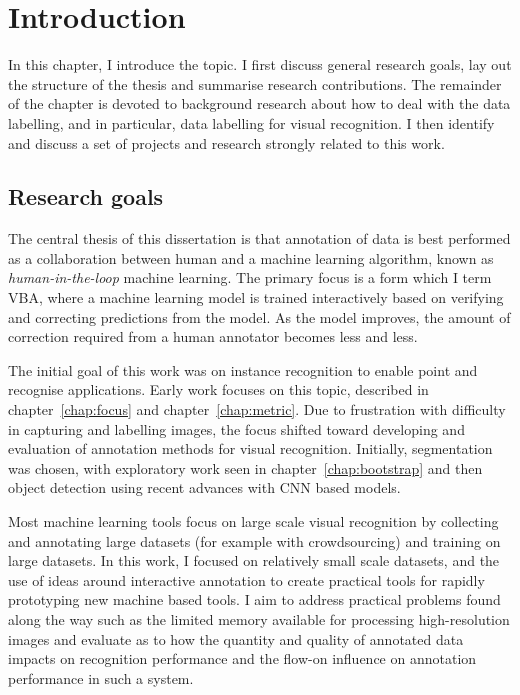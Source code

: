 \chapter{Introduction}
\label{chap:introduction}

In this chapter, I introduce the topic. I first discuss general research goals, lay out the structure of the thesis and summarise research contributions. The remainder of the chapter is devoted to background research about how to deal with the data labelling, and in particular, data labelling for visual recognition. I then identify and discuss a set of projects and research strongly related to this work. 


\section{Research goals}
\label{sec:research_goals}

The central thesis of this dissertation is that annotation of data is best performed as a collaboration between human and a machine learning algorithm, known as \emph{human-in-the-loop} machine learning. The primary focus is a form which I term \gls{VBA}, where a machine learning model is trained interactively based on verifying and correcting predictions from the model. As the model improves, the amount of correction required from a human annotator becomes less and less. 

The initial goal of this work was on instance recognition to enable point and recognise applications. Early work focuses on this topic, described in chapter~\ref{chap:focus} and chapter~\ref{chap:metric}. Due to frustration with difficulty in capturing and labelling images, the focus shifted toward developing and evaluation of annotation methods for visual recognition.  Initially, segmentation was chosen, with exploratory work seen in chapter~\ref{chap:bootstrap} and then object detection using recent advances with \gls{CNN} based models.

Most machine learning tools focus on large scale visual recognition by collecting and annotating large datasets (for example with crowdsourcing) and training on large datasets. In this work, I focused on relatively small scale datasets, and the use of ideas around interactive annotation to create practical tools for rapidly prototyping new machine based tools. I aim to address practical problems found along the way such as the limited memory available for processing high-resolution images and evaluate as to how the quantity and quality of annotated data impacts on recognition performance and the flow-on influence on annotation performance in such a system.

